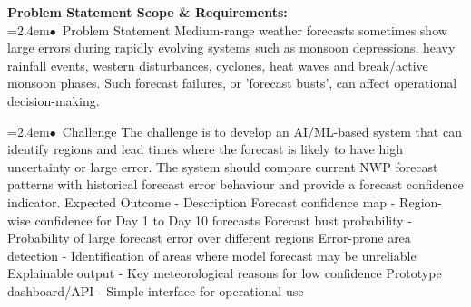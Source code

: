 \documentclass[10pt,a4paper]{article}
\begin{document}
\begin{tcolorbox}[pscard, title={"\textbf{SIH26079} \quad $\vert$ \quad AI-Based Forecast Bust Detection for Medium-Range Weather Forecasts}]
\textbf{\color{sihnavy}Problem Statement Scope \& Requirements:}\\[0.15cm]
\noindent\hspace*{1.2em}\hangindent=2.4em\textcolor{sihblue}{$\bullet$}~\small Problem Statement Medium-range weather forecasts sometimes show large errors during rapidly evolving systems such as monsoon depressions, heavy rainfall events, western disturbances, cyclones, heat waves and break/active monsoon phases. Such forecast failures, or 'forecast busts', can affect operational decision-making.\par\vspace{0.05cm}
\noindent\hspace*{1.2em}\hangindent=2.4em\textcolor{sihblue}{$\bullet$}~\small Challenge The challenge is to develop an AI/ML-based system that can identify regions and lead times where the forecast is likely to have high uncertainty or large error. The system should compare current NWP forecast patterns with historical forecast error behaviour and provide a forecast confidence indicator. Expected Outcome - Description Forecast confidence map - Region-wise confidence for Day 1 to Day 10 forecasts Forecast bust probability - Probability of large forecast error over different regions Error-prone area detection - Identification of areas where model forecast may be unreliable Explainable output - Key meteorological reasons for low confidence Prototype dashboard/API - Simple interface for operational use\par\vspace{0.05cm}

\end{tcolorbox}
\vspace{0.4cm}
{}
\end{document}
